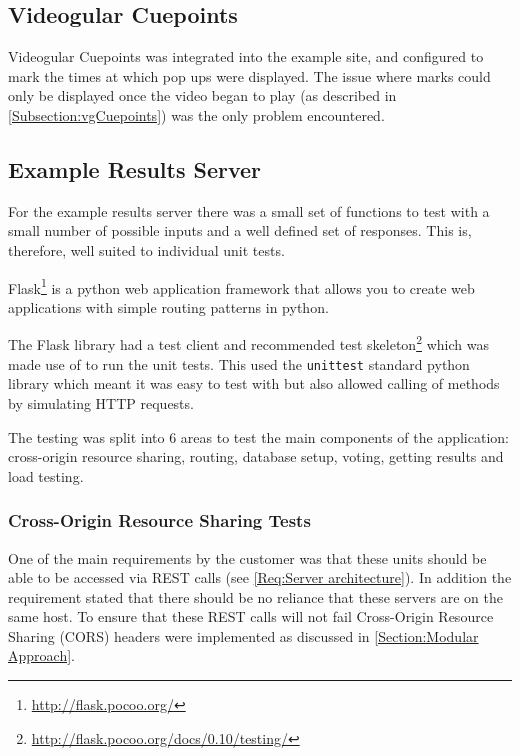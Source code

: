 \subsection{Videogular Cuepoints}
\label{Subsection:Videogular Cuepoints in example}
\gls{Videogular} Cuepoints was integrated into the example site, and configured to mark the times at which pop ups were displayed. The issue where marks could only be displayed once the video began to play (as described in \autoref{Subsection:vgCuepoints}) was the only problem encountered.

\subsection{Example Results Server}
\label{Subsection:Example Results Server in example}

For the example results server there was a small set of functions to test with a small number of possible inputs and a well defined set of responses. This is, therefore, well suited to individual unit tests.

Flask\footnote{\url{http://flask.pocoo.org/}} is a python web application framework that allows you to create web applications with simple routing patterns in python.

The Flask library had a test client and recommended test skeleton\footnote{\url{http://flask.pocoo.org/docs/0.10/testing/}} which was made use of to run the unit tests. This used the \lstinline|unittest| standard python library which meant it was easy to test with but also allowed calling of methods by simulating HTTP requests.

The testing was split into 6 areas to test the main components of the application: cross-origin resource sharing, routing, database setup, voting, getting results and load testing.

\subsubsection{Cross-Origin Resource Sharing Tests}

One of the main requirements by the customer was that these units should be able to be accessed via \gls{REST} calls (see \cref{Req:Server architecture}). In addition the requirement stated that there should be no reliance that these servers are on the same host. To ensure that these \gls{REST} calls will not fail Cross-Origin Resource Sharing (CORS) headers were implemented as discussed in \autoref{Section:Modular Approach}.

